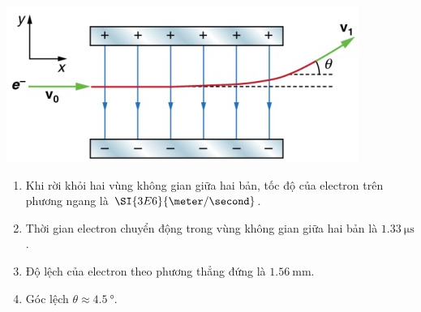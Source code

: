 \begin{enumerate}[label=\bfseries Câu \arabic*:]
	\begin{center}
		\includegraphics[width=0.5\linewidth]{../figs/PH11-MidSem2-02-5}
	\end{center}
	\begin{enumerate}[label=\bfseries \alph*)]
		\item Khi rời khỏi hai vùng không gian giữa hai bản, tốc độ của electron trên phương ngang là $\SI{3E6}{\meter/\second}$.
		\item Thời gian electron chuyển động trong vùng không gian giữa hai bản là $\SI{1.33}{\micro\second}$.
		\item Độ lệch của electron theo phương thẳng đứng là $\SI{1.56}{\milli\meter}$.
		\item Góc lệch $\theta\approx\SI{4.5}{\degree}$.
	\end{enumerate}
\end{enumerate}
